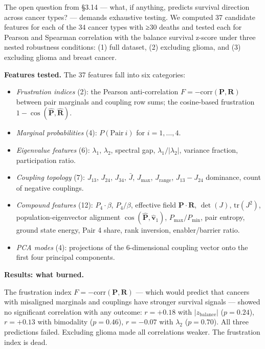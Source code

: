 \documentclass[
  11pt,
]{article}
\providecommand{\tightlist}{%
  \setlength{\itemsep}{0pt}\setlength{\parskip}{0pt}}
\begin{document}
The open question from §3.14 --- what, if anything, predicts survival
direction across cancer types? --- demands exhaustive testing. We
computed 37 candidate features for each of the 34 cancer types with ≥30
deaths and tested each for Pearson and Spearman correlation with the
balance survival z-score under three nested robustness conditions: (1)
full dataset, (2) excluding glioma, and (3) excluding glioma and breast
cancer.

\textbf{Features tested.} The 37 features fall into six categories:

\begin{itemize}
\tightlist
\item
  \emph{Frustration indices} (2): the Pearson anti-correlation
  \(F = -\mathrm{corr}(\mathbf{P}, \mathbf{R})\) between pair marginals
  and coupling row sums; the cosine-based frustration
  \(1 - \cos(\hat{\mathbf{P}}, \hat{\mathbf{R}})\).
\item
  \emph{Marginal probabilities} (4): \(P(\mathrm{Pair}\ i)\) for
  \(i = 1, \ldots, 4\).
\item
  \emph{Eigenvalue features} (6): \(\lambda_1\), \(\lambda_2\), spectral
  gap, \(\lambda_1/|\lambda_2|\), variance fraction, participation
  ratio.
\item
  \emph{Coupling topology} (7): \(J_{13}\), \(J_{24}\), \(J_{34}\),
  \(\bar{J}\), \(J_\mathrm{max}\), \(J_\mathrm{range}\),
  \(J_{13} - J_{24}\) dominance, count of negative couplings.
\item
  \emph{Compound features} (12): \(P_4 \cdot \beta\), \(P_4 / \beta\),
  effective field \(\mathbf{P} \cdot \mathbf{R}\), \(\det(J)\),
  \(\mathrm{tr}(J^2)\), population-eigenvector alignment
  \(\cos(\hat{\mathbf{P}}, \hat{\mathbf{v}}_1)\),
  \(P_\mathrm{max}/P_\mathrm{min}\), pair entropy, ground state energy,
  Pair 4 share, rank inversion, enabler/barrier ratio.
\item
  \emph{PCA modes} (4): projections of the 6-dimensional coupling vector
  onto the first four principal components.
\end{itemize}

\textbf{Results: what burned.}

The frustration index \(F = -\mathrm{corr}(\mathbf{P}, \mathbf{R})\) ---
which would predict that cancers with misaligned marginals and couplings
have stronger survival signals --- showed no significant correlation
with any outcome: \(r = +0.18\) with \(|z_\mathrm{balance}|\)
(\(p = 0.24\)), \(r = +0.13\) with bimodality (\(p = 0.46\)),
\(r = -0.07\) with \(\lambda_2\) (\(p = 0.70\)). All three predictions
failed. Excluding glioma made all correlations weaker. The frustration
index is dead.
\end{document}
